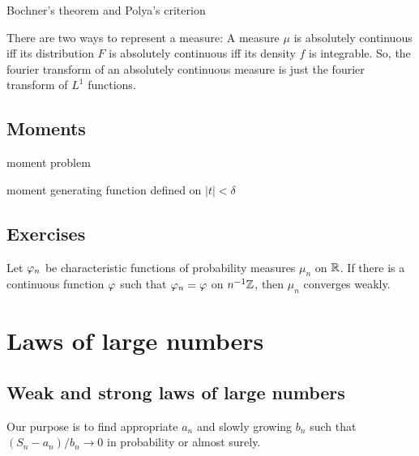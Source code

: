 \documentclass{../note}
\begin{document}
\begin{prb}
Bochner's theorem and Polya's criterion
\end{prb}


There are two ways to represent a measure:
A measure $\mu$ is absolutely continuous iff its distribution $F$ is absolutely continuous iff its density $f$ is integrable.
So, the fourier transform of an absolutely continuous measure is just the fourier transform of $L^1$ functions.



\section{Moments}

moment problem

moment generating function defined on $|t|<\delta$


\section*{Exercises}
\begin{prb}
Let $\varphi_n$ be characteristic functions of probability measures $\mu_n$ on $\mathbb{R}$.
If there is a continuous function $\varphi$ such that $\varphi_n=\varphi$ on $n^{-1}\mathbb{Z}$, then $\mu_n$ converges weakly.
\end{prb}


















\chapter{Laws of large numbers}

\section{Weak and strong laws of large numbers}

Our purpose is to find appropriate $a_n$ and slowly growing $b_n$ such that $(S_n-a_n)/b_n\to0$ in probability or almost surely.
\end{document}
